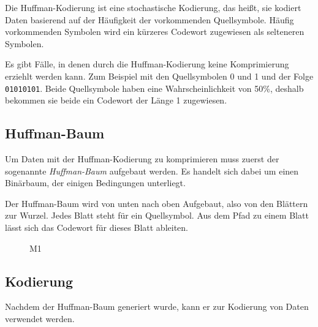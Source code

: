 \documentclass[twoside,11pt,a4paper]{article}
\theoremstyle{break}
\begin{document}
Die Huffman-Kodierung ist eine stochastische Kodierung, das heißt, sie kodiert
Daten basierend auf der Häufigkeit der vorkommenden Quellsymbole. Häufig
vorkommenden Symbolen wird ein kürzeres Codewort zugewiesen als selteneren
Symbolen.

Es gibt Fälle, in denen durch die Huffman-Kodierung keine Komprimierung erziehlt
werden kann. Zum Beispiel mit den Quellsymbolen 0 und 1 und der Folge
{\tt01010101}. Beide Quellsymbole haben eine Wahrscheinlichkeit von 50\%,
deshalb bekommen sie beide ein Codewort der Länge 1 zugewiesen.

\subsection{Huffman-Baum}

Um Daten mit der Huffman-Kodierung zu komprimieren muss zuerst der sogenannte
\emph{Huffman-Baum} aufgebaut werden. Es handelt sich dabei um einen Binärbaum,
der einigen Bedingungen unterliegt.

Der Huffman-Baum wird von unten nach oben Aufgebaut, also von den Blättern zur
Wurzel. Jedes Blatt steht für ein Quellsymbol. Aus dem Pfad zu einem Blatt lässt
sich das Codewort für dieses Blatt ableiten.


\begin{figure}
\centering
{}
\caption{M1} \label{fig:M1}
\end{figure}

\subsection{Kodierung}
Nachdem der Huffman-Baum generiert wurde, kann er zur Kodierung von Daten
verwendet werden.
\end{document}
